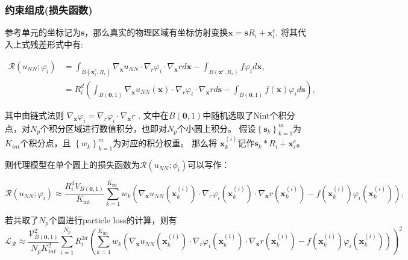 \subsubsection{约束组成(损失函数)}

参考单元的坐标记为$\boldsymbol{s}$，那么真实的物理区域有坐标仿射变换$\boldsymbol{x}=\boldsymbol{s} R_{i}+\boldsymbol{x}_{i}^{c}$, 将其代入上式残差形式中有:

$$\begin{aligned}
\mathcal{R}\left(u_{N N} ; \varphi_{i}\right) & =\int_{B\left(\boldsymbol{x}_{i}^{c}, R_{i}\right)} \nabla_{\boldsymbol{x}} u_{N N} \cdot \nabla_{r} \varphi_{i} \cdot \nabla_{\boldsymbol{x}} r d \boldsymbol{x}-\int_{B\left(\boldsymbol{x}^{c}, R_{i}\right)} f \varphi_{i} d \boldsymbol{x}, \\
& =R_{i}^{d}\left(\int_{B(\mathbf{0}, 1)} \nabla_{\boldsymbol{x}} u_{N N}(\boldsymbol{x}) \cdot \nabla_{r} \varphi_{i} \cdot \nabla_{\boldsymbol{x}} r d \boldsymbol{s}-\int_{B(\mathbf{0}, 1)} f(\boldsymbol{x}) \varphi_{i} d \boldsymbol{s}\right),
\end{aligned}$$

其中由链式法则  $\nabla_{\boldsymbol{x}} \varphi_{i}=\nabla_{r} \varphi_{i} \cdot \nabla_{\boldsymbol{x}} r$ .
文中在$B(\mathbf{0}, 1)$中随机选取了Nint个积分点，对$N_{p}$个积分区域进行数值积分，也即对$N_p$个小圆上积分。
假设$\left\{\boldsymbol{s}_{k}\right\}_{k=1}^{m}$为 $K_{i n t}$个积分点，且 $\left\{w_{k}\right\}_{k=1}^{m}$为对应的积分权重。
那么将  $\boldsymbol{x}_{k}^{(i)}$记作$\boldsymbol{s}_{k} * R_{i}+\boldsymbol{x}_{i}^{c}$。

则代理模型在单个圆上的损失函数为$\mathcal{R}\left(u_{N N} ; \phi_{i}\right)$可以写作：

$$\mathcal{R}\left(u_{N N} ; \varphi_{i}\right) \approx \frac{R_{i}^{d} V_{B(\mathbf{0}, 1)}}{K_{\text {int }}} \sum_{k=1}^{K_{\text {int }}} w_{k}\left(\nabla_{\boldsymbol{x}} u_{N N}\left(\boldsymbol{x}_{k}^{(i)}\right) \cdot \nabla_{r} \varphi_{i}\left(\boldsymbol{x}_{k}^{(i)}\right) \cdot \nabla_{\boldsymbol{x}} r\left(\boldsymbol{x}_{k}^{(i)}\right)-f\left(\boldsymbol{x}_{k}^{(i)}\right) \varphi_{i}\left(\boldsymbol{x}_{k}^{(i)}\right)\right),$$

若共取了$N_p$个圆进行particle loss的计算，则有
$$\mathcal{L}_{\mathcal{R}} \approx \frac{\mathcal{V}_{B(\mathbf{0}, 1)}^{2}}{N_{p} K_{i n t}^{2}} \sum_{i=1}^{N_{p}} R_{i}^{2 d}\left(\sum_{k=1}^{K_{\text {int }}} w_{k}\left(\nabla_{\boldsymbol{x}} u_{N N}\left(\boldsymbol{x}_{k}^{(i)}\right) \cdot \nabla_{r} \varphi_{i}\left(\boldsymbol{x}_{k}^{(i)}\right) \cdot \nabla_{\boldsymbol{x}} r\left(\boldsymbol{x}_{k}^{(i)}\right)-f\left(\boldsymbol{x}_{k}^{(i)}\right) \varphi_{i}\left(\boldsymbol{x}_{k}^{(i)}\right)\right)\right)^{2}$$


